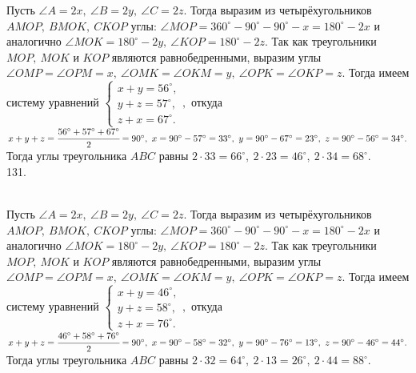 \documentclass[12pt]{article}
\begin{document}
Пусть $\angle A=2x,\ \angle B=2y,\ \angle C=2z.$ Тогда выразим из четырёхугольников $AMOP,\ BMOK,\ CKOP$ углы: $\angle MOP=360^\circ-90^\circ-90^\circ-x=180^\circ-2x$ и аналогично $\angle MOK=180^\circ-2y,\ \angle KOP=180^\circ-2z.$ Так как треугольники $MOP,\ MOK$ и $KOP$ являются равнобедренными, выразим углы $\angle OMP=\angle OPM=x,\ \angle OMK=\angle OKM=y,\ \angle OPK=\angle OKP=z.$ Тогда имеем систему уравнений $\begin{cases} x+y=56^\circ,\\ y+z=57^\circ,\\ z+x=67^\circ.\end{cases},$ откуда $x+y+z=\cfrac{56^\circ+57^\circ+67^\circ}{2}=90^\circ,\ x=90^\circ-57^\circ=33^\circ,\ y=90^\circ-67^\circ=23^\circ,\ z=90^\circ-56^\circ=34^\circ.$ Тогда углы треугольника $ABC$ равны $2\cdot33=66^\circ,\ 2\cdot23=46^\circ,\ 2\cdot34=68^\circ.$\\
131. \begin{figure}[ht!]
\end{figure}\\
Пусть $\angle A=2x,\ \angle B=2y,\ \angle C=2z.$ Тогда выразим из четырёхугольников $AMOP,\ BMOK,\ CKOP$ углы: $\angle MOP=360^\circ-90^\circ-90^\circ-x=180^\circ-2x$ и аналогично $\angle MOK=180^\circ-2y,\ \angle KOP=180^\circ-2z.$ Так как треугольники $MOP,\ MOK$ и $KOP$ являются равнобедренными, выразим углы $\angle OMP=\angle OPM=x,\ \angle OMK=\angle OKM=y,\ \angle OPK=\angle OKP=z.$ Тогда имеем систему уравнений $\begin{cases} x+y=46^\circ,\\ y+z=58^\circ,\\ z+x=76^\circ.\end{cases},$ откуда $x+y+z=\cfrac{46^\circ+58^\circ+76^\circ}{2}=90^\circ,\ x=90^\circ-58^\circ=32^\circ,\ y=90^\circ-76^\circ=13^\circ,\ z=90^\circ-46^\circ=44^\circ.$ Тогда углы треугольника $ABC$ равны $2\cdot32=64^\circ,\ 2\cdot13=26^\circ,\ 2\cdot44=88^\circ.$\\
\end{document}
